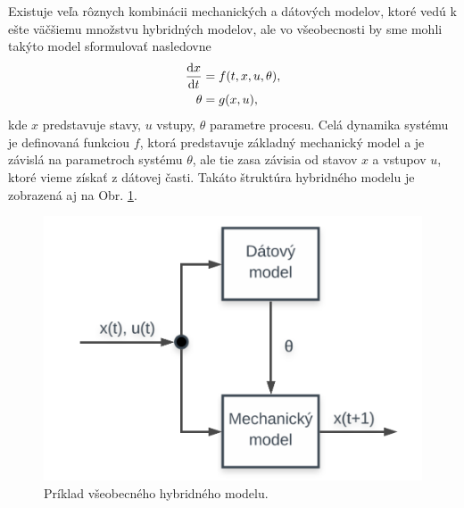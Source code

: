 Existuje veľa rôznych kombinácii mechanických a dátových modelov, ktoré vedú k ešte väčšiemu množstvu hybridných modelov, ale vo všeobecnosti by sme mohli takýto model sformulovať nasledovne
\begin{equation}
	\begin{split}
		\frac{\text{d}x}{\text{d}t} &= f(t,x,u,\theta), \\
		\theta &= g(x,u),
	\end{split}
\end{equation}
kde $ x $ predstavuje stavy, $ u $ vstupy, $ \theta $ parametre procesu. Celá dynamika systému je definovaná funkciou $ f $, ktorá predstavuje základný mechanický model a je závislá na parametroch systému $ \theta $, ale tie zasa závisia od stavov $ x $ a vstupov $ u $, ktoré vieme získať z dátovej časti. Takáto štruktúra hybridného modelu je zobrazená aj na Obr. \ref{fig:hybrid_model_general}.

\begin{figure}
	\centering
	\includegraphics[width=0.5\linewidth]{images/hybrid_model}
	\caption{Príklad všeobecného hybridného modelu.}
	\label{fig:hybrid_model_general}
\end{figure}